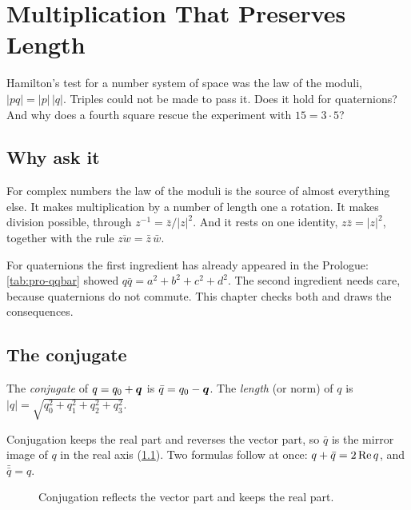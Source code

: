 \chapter{Multiplication That Preserves Length}
\label{ch:length}

\begin{question}
Hamilton's test for a number system of space was the law of the moduli, $|pq|=|p|\,|q|$. Triples could not be made to pass it. Does it hold for quaternions? And why does a fourth square rescue the experiment with $15=3\cdot5$?
\end{question}

\section{Why ask it}

For complex numbers the law of the moduli is the source of almost everything else. It makes multiplication by a number of length one a rotation. It makes division possible, through $z^{-1}=\bar z/|z|^2$. And it rests on one identity, $z\bar z=|z|^2$, together with the rule $\overline{zw}=\bar z\,\bar w$.

For quaternions the first ingredient has already appeared in the Prologue: \cref{tab:pro-qqbar} showed $q\bar q=a^2+b^2+c^2+d^2$. The second ingredient needs care, because quaternions do not commute. This chapter checks both and draws the consequences.

\section{The conjugate}

\begin{definition}\label{def:length-conj}
The \emph{conjugate} of $q=q_0+\bm{q}$ is $\bar q=q_0-\bm{q}$. The \emph{length} (or norm) of $q$ is $|q|=\sqrt{q_0^2+q_1^2+q_2^2+q_3^2}$.
\end{definition}

Conjugation keeps the real part and reverses the vector part, so $\bar q$ is the mirror image of $q$ in the real axis (\cref{fig:length-conj}). Two formulas follow at once: $q+\bar q=2\operatorname{Re} q$, and $\bar{\bar q}=q$.

\begin{figure}[htbp]
  \centering
  \caption{Conjugation reflects the vector part and keeps the real part.}
  \label{fig:length-conj}
\end{figure}

